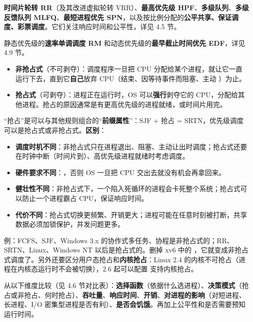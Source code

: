 \textbf{时间片轮转 RR}（及其改进虚拟轮转 VRR）、\textbf{最高优先级 HPF}、\textbf{多级队列}、\textbf{多级反馈队列 MLFQ}、\textbf{最短进程优先 SPN}，以及按比例分配的\textbf{公平共享、保证调度、彩票调度}。它们关注响应时间和公平性，详见 4.5 节。

静态优先级的\textbf{速率单调调度 RM} 和动态优先级的\textbf{最早截止时间优先 EDF}，详见 4.9 节。

\begin{itemize}
    \item \textbf{非抢占式}（不可剥夺）：调度程序一旦把 CPU 分配给某个进程，就让它一直运行下去，直到它\textbf{自己}放弃 CPU（结束、因等待事件而阻塞、主动 ）为止。
    \item \textbf{抢占式}（可剥夺）：进程正在运行时，OS 可以\textbf{强行}剥夺它的 CPU，分配给其他进程。抢占的原因通常是有更高优先级的进程就绪，或时间片用完。
\end{itemize}
“抢占”是可以与其他规则组合的“\textbf{前缀属性}”：SJF + 抢占 = SRTN，优先级调度可以是抢占式或非抢占式。\textbf{区别}：
\begin{itemize}
    \item \textbf{调度时机不同}：非抢占式只在进程退出、阻塞、主动让出时调度；抢占式还要在时钟中断（时间片到）、高优先级进程就绪时考虑调度。
    \item \textbf{硬件要求不同}：，否则 OS 一旦把 CPU 交出去就没有机会再拿回来。
    \item \textbf{健壮性不同}：非抢占式下，一个陷入死循环的进程会卡死整个系统；抢占式可以防止一个进程霸占 CPU，保证响应时间。
    \item \textbf{代价不同}：抢占式切换更频繁、开销更大；进程可能在任意时刻被打断，共享数据必须加锁保护，并发问题更多。
\end{itemize}
例：FCFS、SJF、Windows 3.x 的协作式多任务、协程是非抢占式的；RR、SRTN、Linux、Windows NT 以后是抢占式的。删掉 xv6  中的 ，它就变成非抢占式调度了。另外还要区分用户态抢占和\textbf{内核抢占}：Linux 2.4 的内核不可抢占（进程在内核态运行时不会被切换），2.6 起可以配置  支持内核抢占。

从以下维度比较（见 4.6 节对比表）：\textbf{选择函数}（依据什么选进程）、\textbf{决策模式}（抢占或非抢占、何时抢占）、\textbf{吞吐量}、\textbf{响应时间}、\textbf{开销}、\textbf{对进程的影响}（对短进程、长进程、I/O 密集型进程是否有利）、\textbf{是否会饥饿}。再加上公平性和是否需要预知运行时间。

